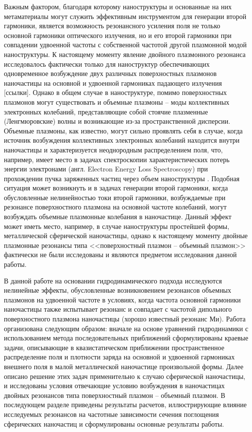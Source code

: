\documentclass[12pt, a4paper]{article}
\begin{document}
Важным фактором, благодаря которому наноструктуры и основанные на них метаматериалы могут служить эффективным инструментом для генерации второй гармоники, является возможность резонансного усиления поля не только основной гармоники оптического излучения, но и его второй гармоники при совпадении удвоенной частоты с собственной частотой другой плазмонной модой наноструктуры. 
К настоящему моменту явление двойного плазмонного резонанса исследовалось фактически только для наноструктур обеспечивающих одновременное возбуждение двух различных поверхностных плазмонов наночастицы на основной и удвоенной гармониках падающего излучения [ссылки].
Однако в общем случае в наноструктуре, помимо поверхностных плазмонов могут существовать и объемные плазмоны \cite{Elibol2022,Gildenburg2016,Ruppin1975,Gildenburg1965} -- моды коллективных электронных колебаний, представляющие собой стоячие плазменные (Ленгмюровские) волны и возникающие из-за пространственной дисперсии. 
 Объемные плазмоны, как известно, могут сильно проявлять себя в случае, когда источник возбуждения коллективных электронных колебаний находится внутри наночастицы и характеризуется неоднородным распределением поля, что, например, имеет место в задачах спектроскопии характеристических потерь энергии электронами (англ. Electron Energy Loss Spectroscopy) при прохождении  пучка заряженных частиц через объем наноструктуры
\cite{Gildenburg2016, Kryshtal2025}. 
Подобная ситуация может возникнуть и в задачах генерации второй гармоники, когда обусловленные нелинейностью токи второй гармоники, возбуждаемые при резонансе поверхностного плазмона на основной частоте колебаний, могут возбуждать объемные плазмонные колебания в наночастице. Данный эффект может иметь место, например, в случае наноструктуры простейшей формы, металлической сферической наночастицы, однако к настоящему моменту двойные плазмонные резонансы типа <<поверхностный плазмон -- объемный плазмон>> фактически не были исследованы и являются предметом исследования данной работы.

В данной работе на основании гидродинамического подхода \cite{Haas2011, Boardman1982, Manfredi2021} исследуются нелинейные эффекты, обусловленные возникновением резонансов объемных плазмонов на удвоенной частоте в условиях, когда частота основной гармоники наночастицы также испытывает резонанс и совпадает с частотой дипольного поверхностного плазмона наночастицы (хорошо известный резонанс Ми). Работа организована следующим образом: вначале на основе уравнений гидродинамики с использованием метода последовательных приближений сформулированы краевые задачи, описывающие в квазистатическом приближении пространственное распределение поля и плотности заряда на основной и удвоенной гармониках внешнего поля в малой металлической наночастице произвольной формы. Далее описано решение этих задач применительно к случаю сферической наночастицы, и исследованы условия отвечающие условию возбуждения в наночастицах двойных резонансов типа поверхностный плазмон – объемный плазмон. В последующем разделе приведены результаты расчетов, иллюстрирующие влияние исследуемых резонансов на частотные зависимости сечения поглощения сферических наночастиц и сформулированы основные результаты работы.
\end{document}
